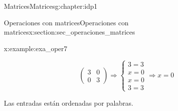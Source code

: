\documentclass[oneside,12pt,]{book}
\newcommand{\xreffont}{\relax}
\newcommand{\amp}{&}
\begin{document}
\begin{chapterptx}{Matrices}{}{Matrices}{}{}{g:chapter:idp1}
\begin{sectionptx}{Operaciones con matrices}{}{Operaciones con matrices}{}{}{x:section:sec_operaciones_matrices}
\begin{example}{}{x:example:exa_oper7}
\begin{enumerate}[label=\alph*]
\begin{equation*}
\begin{pmatrix}
3 \amp 0 \\
0 \amp 3
\end{pmatrix}
\Rightarrow \left\lbrace
\begin{array}{l}
3=3 \\
x=0 \\
x=0 \\
3=3
\end{array}
\right. \Rightarrow x=0
\end{equation*}
%
\end{enumerate}
%
\end{example}
\end{sectionptx}
\end{chapterptx}
%
\backmatter
%
%
%
Las entradas están ordenadas por palabras.%
%
{\xreffont\printindex}
%
\end{document}
